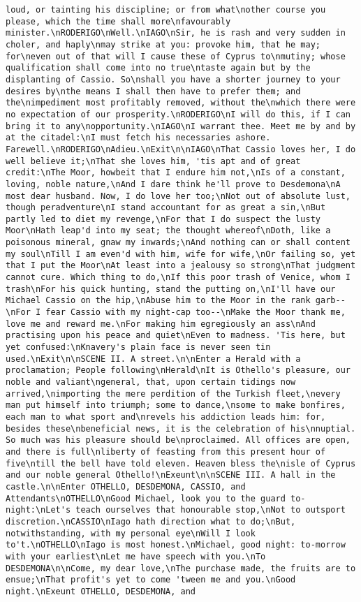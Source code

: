 \begin{verbatim}
loud, or tainting his discipline; or from what\nother course you please, which the time shall more\nfavourably minister.\nRODERIGO\nWell.\nIAGO\nSir, he is rash and very sudden in choler, and haply\nmay strike at you: provoke him, that he may; for\neven out of that will I cause these of Cyprus to\nmutiny; whose qualification shall come into no true\ntaste again but by the displanting of Cassio. So\nshall you have a shorter journey to your desires by\nthe means I shall then have to prefer them; and the\nimpediment most profitably removed, without the\nwhich there were no expectation of our prosperity.\nRODERIGO\nI will do this, if I can bring it to any\nopportunity.\nIAGO\nI warrant thee. Meet me by and by at the citadel:\nI must fetch his necessaries ashore. Farewell.\nRODERIGO\nAdieu.\nExit\n\nIAGO\nThat Cassio loves her, I do well believe it;\nThat she loves him, 'tis apt and of great credit:\nThe Moor, howbeit that I endure him not,\nIs of a constant, loving, noble nature,\nAnd I dare think he'll prove to Desdemona\nA most dear husband. Now, I do love her too;\nNot out of absolute lust, though peradventure\nI stand accountant for as great a sin,\nBut partly led to diet my revenge,\nFor that I do suspect the lusty Moor\nHath leap'd into my seat; the thought whereof\nDoth, like a poisonous mineral, gnaw my inwards;\nAnd nothing can or shall content my soul\nTill I am even'd with him, wife for wife,\nOr failing so, yet that I put the Moor\nAt least into a jealousy so strong\nThat judgment cannot cure. Which thing to do,\nIf this poor trash of Venice, whom I trash\nFor his quick hunting, stand the putting on,\nI'll have our Michael Cassio on the hip,\nAbuse him to the Moor in the rank garb--\nFor I fear Cassio with my night-cap too--\nMake the Moor thank me, love me and reward me.\nFor making him egregiously an ass\nAnd practising upon his peace and quiet\nEven to madness. 'Tis here, but yet confused:\nKnavery's plain face is never seen tin used.\nExit\n\nSCENE II. A street.\n\nEnter a Herald with a proclamation; People following\nHerald\nIt is Othello's pleasure, our noble and valiant\ngeneral, that, upon certain tidings now arrived,\nimporting the mere perdition of the Turkish fleet,\nevery man put himself into triumph; some to dance,\nsome to make bonfires, each man to what sport and\nrevels his addiction leads him: for, besides these\nbeneficial news, it is the celebration of his\nnuptial. So much was his pleasure should be\nproclaimed. All offices are open, and there is full\nliberty of feasting from this present hour of five\ntill the bell have told eleven. Heaven bless the\nisle of Cyprus and our noble general Othello!\nExeunt\n\nSCENE III. A hall in the castle.\n\nEnter OTHELLO, DESDEMONA, CASSIO, and Attendants\nOTHELLO\nGood Michael, look you to the guard to-night:\nLet's teach ourselves that honourable stop,\nNot to outsport discretion.\nCASSIO\nIago hath direction what to do;\nBut, notwithstanding, with my personal eye\nWill I look to't.\nOTHELLO\nIago is most honest.\nMichael, good night: to-morrow with your earliest\nLet me have speech with you.\nTo DESDEMONA\n\nCome, my dear love,\nThe purchase made, the fruits are to ensue;\nThat profit's yet to come 'tween me and you.\nGood night.\nExeunt OTHELLO, DESDEMONA, and 
\end{verbatim}
